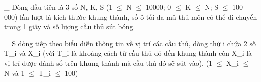 \_ Dòng đầu tiên là 3 số N, K, S (1 $\le$  N  $\le$ 10000; 0 $\le$  K  $\le$ N; S $\le$ 100 000) lần lượt là kích thước khung thành, số ô tối đa mà thủ môn có thể di chuyển trong 1 giây và số lượng cầu thủ sút bóng.   


   \_ S dòng tiếp theo biểu diễn thông tin về vị trí các cầu thủ, dòng thứ i chứa 2 số T\_i và X\_i (với T\_i là khoảng cách từ cầu thủ đó đến khung thành còn X\_i là vị trí được đánh số trên khung thành mà cầu thủ đó sẽ sút vào). (1 $\le$  X\_i  $\le$ N và 1 $\le$  T\_i  $\le$ 100)